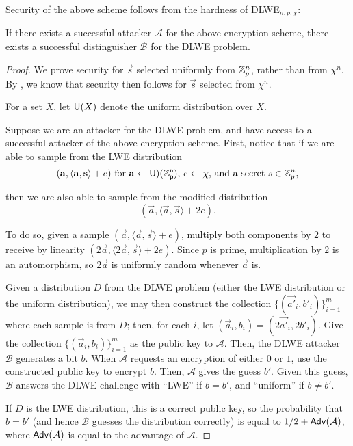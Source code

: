     Security of the above scheme follows from the hardness of DLWE$_{n, p, \chi}$:
    \begin{lemma}
        If there exists a successful attacker $\mathcal{A}$ for the above encryption scheme, there exists a successful distinguisher $\mathcal{B}$ for the DLWE problem.
    \end{lemma}
    \begin{proof}
    We prove security for $\vec{s}$ selected uniformly from $\mathbb{Z}_p^n$, rather than from $\chi^n$. By \cite{Peikertsurvey}, we know that security then follows for $\vec{s}$ selected from $\chi^n$.

    For a set $X$, let ${\sf U}(X)$ denote the uniform distribution over $X$.

    Suppose we are an attacker for the DLWE problem, and have access to a successful attacker of the above encryption scheme. First, notice that if we are able to sample from the LWE distribution
    \[(\mathbf{a}, \langle \mathbf{a}, \mathbf{s} \rangle + e) \text{ for $\mathbf{a} \leftarrow {\sf U)(\mathbb{Z}_p^n)}$, $e \leftarrow \chi$, and a secret $s \in \mathbb{Z}_p^n$},\]

    then we are also able to sample from the modified distribution
    \[(\vec{a}, \langle \vec{a}, \vec{s} \rangle + 2e).\]

    To do so, given a sample $(\vec{a}, \langle \vec{a}, \vec{s} \rangle + e)$, multiply both components by $2$ to receive by linearity $(2 \vec{a}, \langle 2 \vec{a}, \vec{s} \rangle + 2e)$. Since $p$ is prime, multiplication by $2$ is an automorphism, so $2 \vec{a}$ is uniformly random whenever $\vec{a}$ is.

    Given a distribution $D$ from the DLWE problem (either the LWE distribution or the uniform distribution), we may then construct the collection $\{(\vec{a'}_i, b'_i)\}_{i = 1}^m$ where each sample is from $D$; then, for each $i$, let $(\vec{a}_i, b_i) = (2\vec{a'}_i, 2b'_i)$. Give the collection $\{(\vec{a}_i, b_i)\}_{i = 1}^m$ as the public key to $\mathcal{A}$.
    Then, the DLWE attacker $\mathcal{B}$ generates a bit $b$. When $\mathcal{A}$ requests an encryption of either $0$ or $1$, use the constructed public key to encrypt $b$. Then, $\mathcal{A}$ gives the guess $b'$. Given this guess, $\mathcal{B}$ answers the DLWE challenge with ``LWE'' if $b = b'$, and ``uniform'' if $b \neq b'$.

    If $D$ is the LWE distribution, this is a correct public key, so the probability that $b = b'$ (and hence $\mathcal{B}$ guesses the distribution correctly) is equal to $1/2 + {\sf Adv}(\mathcal{A})$, where ${\sf Adv}(\mathcal{A})$ is equal to the advantage of $\mathcal{A}$.


\end{proof}
